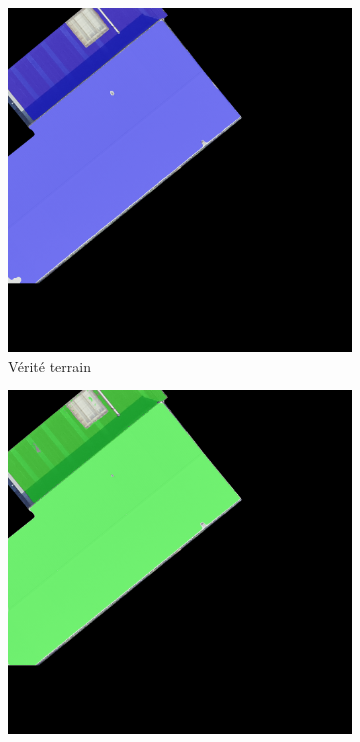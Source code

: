 \begin{otherlanguage}{french}
\begin{figure}[htbp]
\begin{subfigure}{0.32\textwidth}
        \includegraphics[width=\textwidth]{02-main//figures/ch4/kfold_ensembles/linknet_timm-efficientnet-b5/best_cases/best_3_iou0.986_24931117_tile_18_5_f475a0_overlay_gt.png}
        \caption{Vérité terrain}
    \end{subfigure}
    \hfill
    \begin{subfigure}{0.32\textwidth}
        \includegraphics[width=\textwidth]{02-main//figures/ch4/kfold_ensembles/linknet_timm-efficientnet-b5/best_cases/best_3_iou0.986_24931117_tile_18_5_f475a0_overlay_pred.png}

\end{subfigure}
\end{figure}
\end{otherlanguage}
